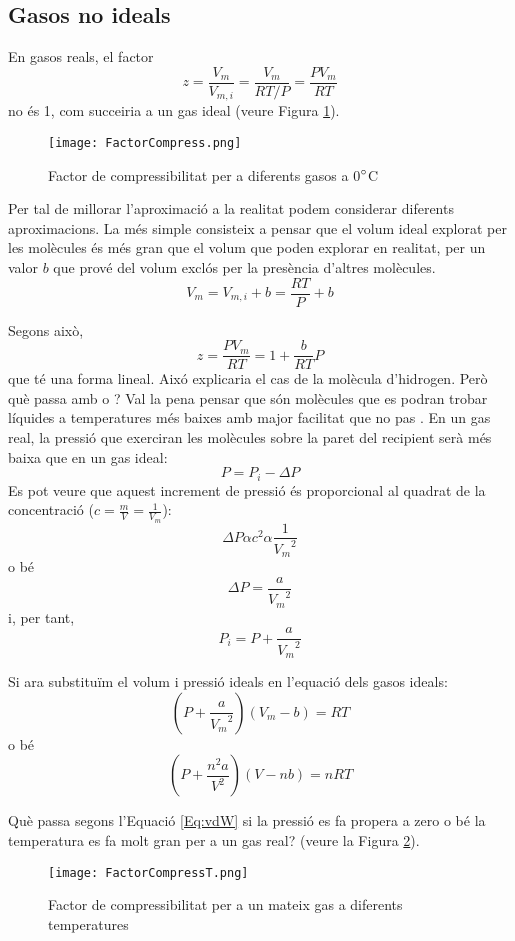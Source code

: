 \subsection{Gasos no ideals}

En gasos reals, el factor 
\[z=\frac{V_m}{V_{m,i}}=\frac{V_m}{RT/P}=\frac{PV_m}{RT}\]
no és 1, com succeiria a un gas ideal (veure Figura \ref{fig:FactorCompress}).
\begin{figure}[h]
\centering
\texttt{[image: FactorCompress.png]}
\caption{Factor de compressibilitat per a diferents gasos a 0$\degree$C}
\label{fig:FactorCompress}
\end{figure}

Per tal de millorar l'aproximació a la realitat podem considerar diferents aproximacions. La més simple consisteix a pensar que el volum ideal explorat per les molècules és més gran que el volum que poden explorar en realitat, per un valor $b$ que prové del volum exclós per la presència d'altres molècules.
\[V_m = V_{m,i}+b=\frac{RT}{P}+b\]

Segons això,
\[z=\frac{PV_m}{RT}=1+\frac{b}{RT}P\]
que té una forma lineal. Aixó explicaria el cas de la molècula d'hidrogen.
Però què passa amb  o ? Val la pena pensar que són molècules que es podran trobar líquides a temperatures més baixes amb major facilitat que no pas . En un gas real, la pressió que exerciran les molècules sobre la paret del recipient serà més baixa que en un gas ideal:
\[P=P_i -\Delta P\]
Es pot veure que aquest increment de pressió és proporcional al quadrat de la concentració ($c=\frac{m}{V}=\frac{1}{V_m}$):
\[\Delta P \alpha c^2 \alpha \frac{1}{{V_m}^2} \]
o bé
\[\Delta P = \frac{a}{{V_m}^2}\]
i, per tant, 
\[ P_i=P+\frac{a}{{V_m}^2}\]

Si ara substituïm el volum i pressió ideals en l'equació dels gasos ideals:
\[
\left( P + \frac{a}{{V_m}^2} \right) (V_m -b)=RT
\]
o bé
\begin{equation}
\left( P + \frac{n^2 a}{V^2} \right) (V -nb)=nRT
\label{Eq:vdW}
\end{equation}

\begin{exr}
Què passa segons l'Equació \ref{Eq:vdW} si la pressió es fa propera a zero o bé la temperatura es fa molt gran per a un gas real? (veure la Figura \ref{fig:FactorCompressT}).
\end{exr}

\begin{figure}[h]
\centering
\texttt{[image: FactorCompressT.png]}
\caption{Factor de compressibilitat per a un mateix gas a diferents temperatures}
\label{fig:FactorCompressT}
\end{figure}

